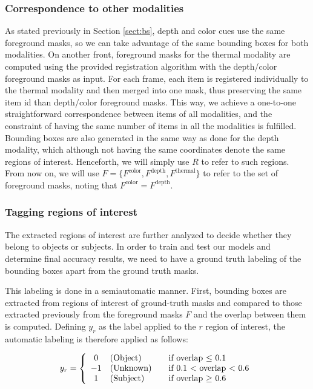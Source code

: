 \documentclass[10pt,twocolumn,letterpaper]{article}
\begin{document}
\subsubsection{Correspondence to other modalities} 
\label{sssec:correspondence}
As stated previously in Section \ref{sect:bs}, depth and color cues use the same foreground masks, so we can take advantage of the same bounding boxes for both modalities. On another front, foreground masks for the thermal modality are computed using the provided registration algorithm with the depth/color foreground masks as input. For each frame, each item is registered individually to the thermal modality and then merged into one mask, thus preserving the same item id than depth/color foreground masks. This way, we achieve a one-to-one straightforward correspondence between items of all modalities, and the constraint of having the same number of items in all the modalities is fulfilled. Bounding boxes are also generated in the same way as done for the depth modality, which although not having the same coordinates denote the same regions of interest. Henceforth, we will simply use $R$ to refer to such regions. From now on, we will use $F = \{F^\mathrm{color}, F^\mathrm{depth}, F^\mathrm{thermal}\}$ to refer to the set of foreground masks, noting that $F^\mathrm{color} = F^\mathrm{depth}$.

\subsubsection{Tagging regions of interest}
\label{sssec:tagging}
The extracted regions of interest are further analyzed to decide whether they belong to objects or subjects. In order to train and test our models and determine final accuracy results, we need to have a ground truth labeling of the bounding boxes apart from the ground truth masks. 

This labeling is done in a semiautomatic manner. First, bounding boxes are extracted from regions of interest of ground-truth masks and compared to those extracted previously from the foreground masks $F$ and the overlap between them is computed. Defining $y_r$ as the label applied to the $r$ region of interest, the automatic labeling is therefore applied as follows: 

\begin{gather}
\text{$y_r$} = \left\{ 
  \begin{array}{c l l}
    0  & \text{(Object)} & \quad \text{if overlap $\leq$ 0.1 }\\
    -1 & \text{(Unknown)} & \quad \text{if 0.1 $<$ overlap $<$ 0.6}\\
    1 & \text{(Subject)} & \quad \text{if overlap $\geq$ 0.6 }
  \end{array} \right.
 \end{gather}
\end{document}
